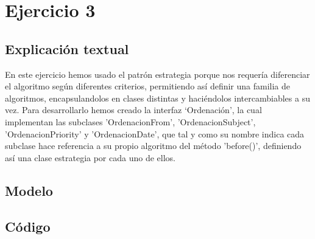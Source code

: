 \documentclass[11pt,a4paper]{article}
\begin{document}
\section{Ejercicio 3}


\subsection{Explicación textual}

En este ejercicio hemos usado el patrón estrategia porque nos requería diferenciar el algoritmo según diferentes criterios, permitiendo así definir una familia de algoritmos, encapsulandolos en clases distintas y haciéndolos intercambiables a su vez. Para desarrollarlo hemos creado la interfaz ‘Ordenación', la cual implementan las subclases 'OrdenacionFrom', 'OrdenacionSubject', 'OrdenacionPriority' y  'OrdenacionDate', que tal y como su nombre indica cada subclase hace referencia a su propio algoritmo del método 'before()', definiendo así una clase estrategia por cada uno de ellos.


\subsection{Modelo}

\begin{figure}[H]
\end{figure}

\subsection{Código}
\end{document}
